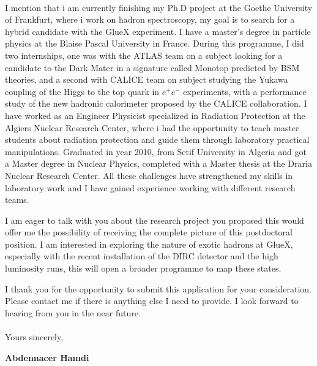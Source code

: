 \documentclass[11pt]{letter}
\begin{document}
~\par I mention that i am currently finishing my Ph.D project at the Goethe University of Frankfurt, where i work on hadron spectroscopy, my goal is to search for a hybrid candidate with the GlueX experiment. I have a master's degree in particle physics at the Blaise Pascal University in France. During this programme, I did two internships, one was with the ATLAS team on a subject looking for a candidate to the Dark Mater in a signature called Monotop predicted by BSM theories, and a second with CALICE team on subject studying the Yukawa coupling of the Higgs to the top quark in $e^{+}e^{-}$ experiments, with a performance study of the new hadronic calorimeter proposed by the CALICE collaboration. I have worked as an Engineer Physicist specialized in Radiation Protection at the Algiers Nuclear Research Center, where i had the opportunity to teach master students about radiation protection and guide them through laboratory practical manipulations. Graduated in year 2010, from Setif University in Algeria and got a Master degree in Nuclear Physics, completed with a Master thesis at the Draria Nuclear Research Center. All these challenges have strengthened my skills in laboratory work and I have gained experience working with different research teams.
~\par I am eager to talk with you about the research project you proposed this would offer me the possibility of receiving the complete picture of this postdoctoral position. I am interested in exploring the nature of exotic hadrons at GlueX, especially with the recent installation of the DIRC detector and the high luminosity runs, this will open a broader programme to map these states. 
~\par I thank you for the opportunity to submit this application for your consideration. Please contact me if there is anything else I need to provide. I look forward to hearing from you in the near future.\\ \\ %
Yours sincerely,

\begin{flushleft}
 {\bfseries Abdennacer Hamdi}
 \end{flushleft}
 \vfill
 
\end{document}
